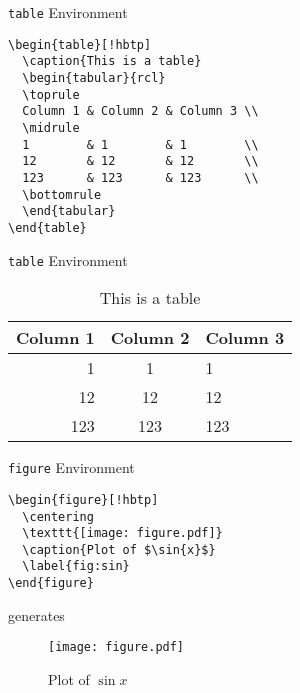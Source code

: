 \begin{frame}[fragile]{\texttt{table} Environment}
\protect\hypertarget{table-environment}{}
\begin{verbatim}
\begin{table}[!hbtp]
  \caption{This is a table}
  \begin{tabular}{rcl}
  \toprule
  Column 1 & Column 2 & Column 3 \\
  \midrule
  1        & 1        & 1        \\
  12       & 12       & 12       \\
  123      & 123      & 123      \\
  \bottomrule
  \end{tabular}
\end{table}
\end{verbatim}
\end{frame}

\begin{frame}{\texttt{table} Environment}
\protect\hypertarget{table-environment-1}{}
\begin{table}[!hbtp]
  \caption{This is a table}
  \begin{tabular}{rcl}
  \toprule
  Column 1 & Column 2 & Column 3 \\
  \midrule
  1        & 1        & 1        \\
  12       & 12       & 12       \\
  123      & 123      & 123      \\
  \bottomrule
  \end{tabular}
\end{table}
\end{frame}

\begin{frame}[fragile]{\texttt{figure} Environment}
\protect\hypertarget{figure-environment}{}
\begin{verbatim}
\begin{figure}[!hbtp]
  \centering
  \texttt{[image: figure.pdf]}
  \caption{Plot of $\sin{x}$}
  \label{fig:sin}
\end{figure}
\end{verbatim}

generates

\begin{figure}[!hbtp]
  \centering
  \texttt{[image: figure.pdf]}
  \caption{Plot of $\sin{x}$}
  \label{fig:sin}
\end{figure}
\end{frame}

